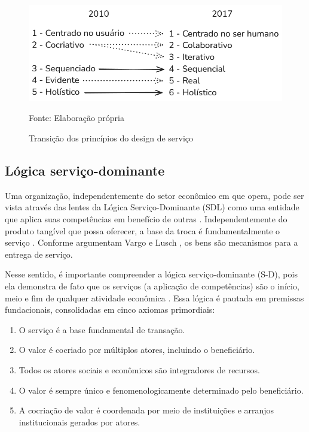 \begin{figure}[h]
	\centering %
	\includegraphics[width=16cm]{figuras/principios.png} %
	\caption{Transição dos princípios do design de serviço}
	Fonte: Elaboração própria
	\label{figura:qualquernome}
\end{figure}

\subsection{Lógica serviço-dominante}

Uma organização, independentemente do setor econômico em que opera, pode ser vista através das lentes da Lógica Serviço-Dominante (SDL) como uma entidade que aplica suas competências em benefício de outras \cite{VargoLusch2004Evolving}. Independentemente do produto tangível que possa oferecer, a base da troca é fundamentalmente o serviço \cite{VargoLusch2004Evolving}. Conforme argumentam Vargo e Lusch \cite{VargoLusch2004Evolving}, os bens são mecanismos para a entrega de serviço.

Nesse sentido, é importante compreender a lógica serviço-dominante (S-D), pois ela demonstra de fato que os serviços (a aplicação de competências) são o início, meio e fim de qualquer atividade econômica \cite{VargoLusch2004Evolving}. Essa lógica é pautada em premissas fundacionais, consolidadas em cinco axiomas primordiais:

\begin{enumerate}
	\item O serviço é a base fundamental de transação.
	\item O valor é cocriado por múltiplos atores, incluindo o beneficiário.
	\item Todos os atores sociais e econômicos são integradores de recursos.
	\item O valor é sempre único e fenomenologicamente determinado pelo beneficiário.
	\item A cocriação de valor é coordenada por meio de instituições e arranjos institucionais gerados por atores.
\end{enumerate}

